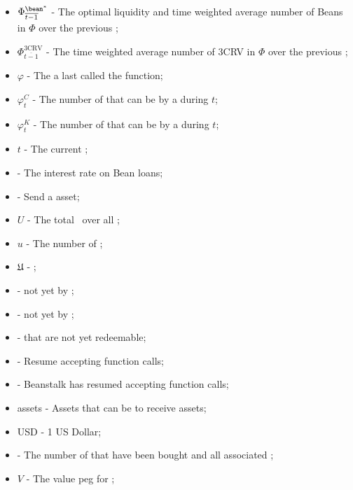 \documentclass[class=article, crop=false]{standalone}
\begin{document}
\begin{itemize}[topsep=0pt, itemsep=3pt,leftmargin=16pt]
    \item[] $\Phi_{\overline{t-1}}^{{\bean}^*}$ - The optimal liquidity and time weighted average number of Beans in $\Phi$ over the previous ;
    \item[] $\Phi_{\overline{t-1}}^{\text{3CRV}}$ - The time weighted average number of 3CRV in $\Phi$ over the previous ;
    \item[] $\varphi$ - The  a  last called the  function;
    \item[] ${\varphi}_t^C$ - The number of   that can be  by a  during $t$;
    \item[] ${\varphi}_t^K$ - The number of   that can be  by a  during $t$;
    \item[] $t$ - The current ;
    \item[]  - The interest rate on Bean loans;
    \item[]  - Send a  asset;
    \item[] $U$ - The total  \Bean\ over all ;
    \item[] $u$ - The number of  \Bean;
    \item[] $\mathfrak{U}$ -  ;
    \item[]   -  not yet  by  ;
    \item[]   -  not yet  by  ;
    \item[]   -  that are not yet redeemable;
    \item[]  - Resume accepting  function calls;
    \item[]  - Beanstalk has resumed accepting  function calls;
    \item[]  assets - Assets that can be  to receive  assets;
    \item[] USD - 1 US Dollar;
    \item[]   - The number of  that have been bought and  all associated ;
    \item[] $V$ - The value peg for ;

\end{itemize}
\end{document}
